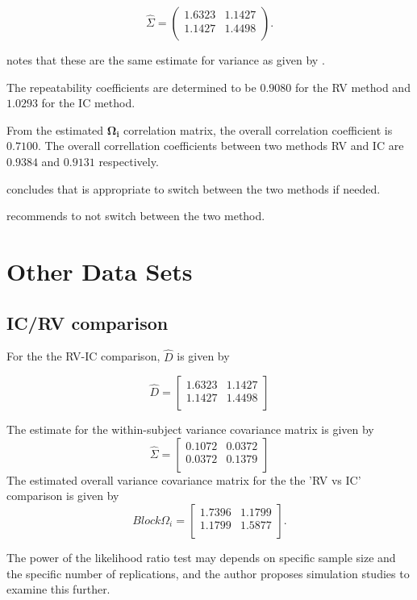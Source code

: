 \begin{equation}\hat{\Sigma}=\left(
\begin{array}{cc}
1.6323 & 1.1427 \\
1.1427 & 1.4498 \\
\end{array}
\right).
\end{equation}

\citet{ARoy2009} notes that these are the same estimate for variance as given by \citet{BA99}.


The repeatability coefficients are determined to be $0.9080$ for the RV method and $1.0293$ for the IC method.

From the estimated $\boldsymbol{\Omega_{i}}$ correlation matrix, the overall correlation coefficient is $0.7100$.
The overall correllation coefficients between two methods RV and IC are $0.9384$ and $0.9131$ respectively.

\citet{ARoy2009} concludes that is appropriate to switch between the two methods if needed.



\citet{ARoy2009} recommends to not switch between the two method.



\chapter{Other Data Sets}
\section{IC/RV comparison}

For the the RV-IC comparison, $\hat{D}$ is given by


\begin{equation}
\hat{D}= \left[ \begin{array}{cc}
1.6323 & 1.1427  \\
1.1427 & 1.4498 \\
\end{array} \right]
\end{equation}

The estimate for the within-subject variance covariance matrix is
given by
\begin{equation}
\hat{\Sigma}= \left[ \begin{array}{cc}
0.1072 & 0.0372  \\
0.0372 & 0.1379  \\
\end{array}\right]
\end{equation}
The estimated overall variance covariance matrix for the the 'RV
vs IC' comparison is given by
\begin{equation}
Block \Omega_{i}= \left[ \begin{array}{cc}
1.7396 & 1.1799  \\
1.1799 & 1.5877  \\
\end{array} \right].
\end{equation}

The power of the
likelihood ratio test may depends on specific sample size and the
specific number of  replications, and the author proposes
simulation studies to examine this further.







